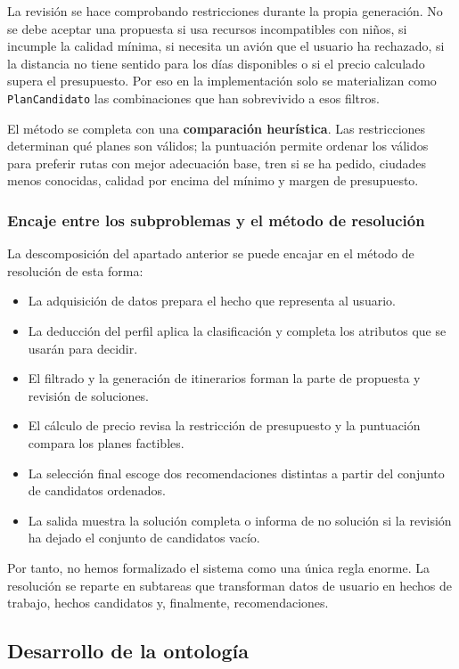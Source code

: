 \documentclass[11pt,a4paper]{article}
\begin{document}
La revisi\'on se hace comprobando restricciones durante la propia generaci\'on.
No se debe aceptar una propuesta si usa recursos incompatibles con ni\~nos, si
incumple la calidad m\'inima, si necesita un avi\'on que el usuario ha rechazado,
si la distancia no tiene sentido para los d\'ias disponibles o si el precio
calculado supera el presupuesto. Por eso en la implementaci\'on solo se
materializan como \texttt{PlanCandidato} las combinaciones que han sobrevivido
a esos filtros.

El m\'etodo se completa con una \textbf{comparaci\'on heur\'istica}. Las
restricciones determinan qu\'e planes son v\'alidos; la puntuaci\'on permite
ordenar los v\'alidos para preferir rutas con mejor adecuaci\'on base, tren si se
ha pedido, ciudades menos conocidas, calidad por encima del m\'inimo y margen de
presupuesto.

\subsubsection{Encaje entre los subproblemas y el m\'etodo de resoluci\'on}
La descomposici\'on del apartado anterior se puede encajar en el m\'etodo de
resoluci\'on de esta forma:
\begin{itemize}
    \item La adquisici\'on de datos prepara el hecho que representa al usuario.
    \item La deducci\'on del perfil aplica la clasificaci\'on y completa los
    atributos que se usar\'an para decidir.
    \item El filtrado y la generaci\'on de itinerarios forman la parte de
    propuesta y revisi\'on de soluciones.
    \item El c\'alculo de precio revisa la restricci\'on de presupuesto y la
    puntuaci\'on compara los planes factibles.
    \item La selecci\'on final escoge dos recomendaciones distintas a partir del
    conjunto de candidatos ordenados.
    \item La salida muestra la soluci\'on completa o informa de no soluci\'on si
    la revisi\'on ha dejado el conjunto de candidatos vac\'io.
\end{itemize}

Por tanto, no hemos formalizado el sistema como una \'unica regla enorme. La
resoluci\'on se reparte en subtareas que transforman datos de usuario en hechos
de trabajo, hechos candidatos y, finalmente, recomendaciones.

\subsection{Desarrollo de la ontolog\'ia}
\end{document}
